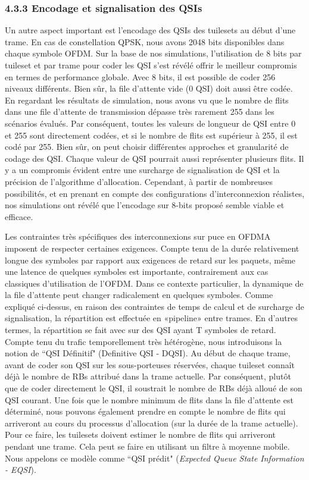 \subsubsection*{4.3.3 Encodage et signalisation des QSIs}

Un autre aspect important est l'encodage des QSIs des tuilesets au début d'une trame. En cas de constellation QPSK, nous avons 2048 bits disponibles dans chaque symbole OFDM. Sur la base de nos simulations, l’utilisation de 8 bits par tuileset et par trame pour coder les QSI s’est révélé offrir le meilleur compromis en termes de performance globale. Avec 8 bits, il est possible de coder 256 niveaux différents. Bien sûr, la file d'attente vide (0 QSI) doit aussi être codée. En regardant les résultats de simulation, nous avons vu que le nombre de flits dans une file d'attente de transmission dépasse très rarement 255 dans les scénarios évalués. Par conséquent, toutes les valeurs de longueur de QSI entre 0 et 255 sont directement codées, et si le nombre de flits est supérieur à 255, il est codé par 255. Bien sûr, on peut choisir différentes approches et granularité de codage des QSI. Chaque valeur de QSI pourrait aussi représenter plusieurs flits. Il y a un compromis évident entre une surcharge de signalisation de QSI et la précision de l'algorithme d'allocation. Cependant, à partir de nombreuses possibilités, et en prenant en compte des configurations d'interconnexion réalistes, nos simulations ont révélé que l'encodage sur 8-bits proposé semble viable et efficace.

Les contraintes très spécifiques des interconnexions sur puce en OFDMA imposent de respecter certaines exigences. Compte tenu de la durée relativement longue des symboles par rapport aux exigences de retard sur les paquets, même une latence de quelques  symboles est importante, contrairement aux cas classiques d’utilisation de l’OFDM. Dans ce contexte particulier, la dynamique de la file d'attente peut changer radicalement en quelques symboles. Comme expliqué ci-dessus, en raison des contraintes de temps de calcul et de surcharge de signalisation, la répartition est effectuée en «pipeline» entre trames. En d'autres termes, la répartition se fait avec sur des QSI ayant T symboles de retard. Compte tenu du trafic temporellement très hétérogène, nous introduisons la notion de ``QSI Définitif" (Definitive QSI - DQSI). Au début de chaque trame, avant de coder son QSI sur les sous-porteuses réservées, chaque tuileset connaît déjà le nombre de RBs attribué dans la trame actuelle. Par conséquent, plutôt que de coder directement le QSI, il soustrait le nombre de RBs déjà alloué de son QSI courant.
Une fois que le nombre minimum de flits dans la file d'attente est déterminé, nous pouvons également prendre en compte le nombre de flits qui arriveront au cours du processus d'allocation (sur la durée de la trame actuelle). Pour ce faire, les tuilesets doivent estimer le nombre de flits qui arriveront pendant une trame. Cela peut se faire en utilisant un filtre à moyenne mobile. Nous appelons ce modèle comme ``QSI prédit" (\textit{Expected Queue State Information - EQSI}).


